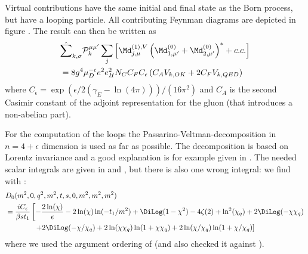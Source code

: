 Virtual contributions have the same initial and final state as the Born process, but have a looping particle. All contributing Feynman diagrams are depicted in figure .
The result can then be written as
\begin{align}
&\hat\sum_{k,\sigma}\mathcal P_{k}^{\mu\mu'}\sum_{j}\left[\Md^{(1),V}_{j,\mu}\left(\Md^{(0)}_{1,\mu'}+\Md^{(0)}_{2,\mu'}\right)^*+c.c.\right] \nonumber\\
 &= 8g^4\mu_D^{-\epsilon}e^2e_H^2 N_C C_FC_\epsilon\left( C_A V_{k,OK} + 2C_F V_{k,QED}\right)
\end{align}
where $C_\epsilon = \exp(\epsilon/2(\gamma_E-\ln(4\pi)))/(16\pi^2)$ and $C_A$ is the second Casimir constant of the adjoint representation for the gluon (that introduces a non-abelian part).

For the computation of the loops the Passarino-Veltman-decomposition\cite{Passarino:1978jh} in $n=4+\epsilon$ dimension is used as far as possible. The decomposition is based on Lorentz invariance and a good explanation is for example given in \cite{Bojak:2000eu}. The needed scalar integrals are given in \cite{PhysRevD4054} and \cite{Laenen1993162}, but there is also one wrong integral: we find with \cite[Box 16]{Ellis:2007qk}:
\begin{align}
&D_0(m^2,0,q^2,m^2,t,s,0,m^2,m^2,m^2)\nonumber\\
 &=\frac{i C_\epsilon}{\beta s t_1}\left[-\frac{2\ln(\chi)}{\epsilon} -2\ln(\chi)\ln(-t_1/m^2)+\DiLog(1-\chi^2)-4\zeta(2)+\ln^2(\chi_q) + 2\DiLog(-\chi\chi_q)\right.\nonumber\\
 &\hspace{40pt}\left. +2\DiLog(-\chi/\chi_q)+2\ln(\chi\chi_q)\ln(1+\chi\chi_q)+2\ln(\chi/\chi_q)\ln(1+\chi/\chi_q)\right]
\end{align}
where we used the argument ordering of \LoopTools\cite{Hahn:1998yk,LoopTools212Guide} (and also checked it against \LoopTools).

